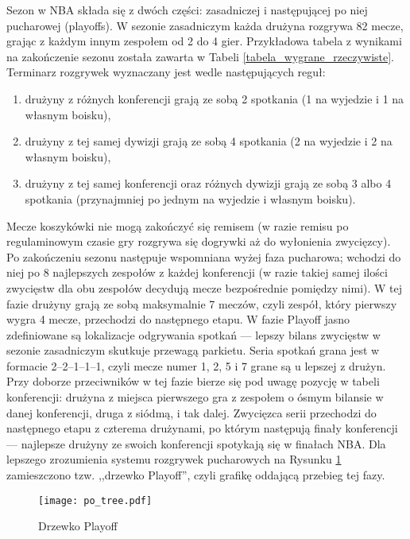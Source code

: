 \documentclass[inzynierska]{pwr_wmat_praca_dyplomowa}
\theoremstyle{plain}
\numberwithin{theorem}{chapter}
\theoremstyle{definition}
\numberwithin{theorem}{chapter}
\begin{document}
Sezon w NBA składa się z dwóch części: zasadniczej i następującej po niej pucharowej (playoffs). W sezonie zasadniczym każda drużyna rozgrywa 82 mecze, grając z każdym innym zespołem od 2 do 4 gier. Przykładowa tabela z wynikami na zakończenie sezonu została zawarta w Tabeli \ref{tabela_wygrane_rzeczywiste}. Terminarz rozgrywek wyznaczany jest wedle następujących reguł:
\begin{enumerate}
	\item drużyny z różnych konferencji grają ze sobą 2 spotkania (1 na wyjedzie i 1 na własnym boisku),
	\item drużyny z tej samej dywizji grają ze sobą 4 spotkania (2 na wyjedzie i 2 na własnym boisku),
	\item drużyny z tej samej konferencji oraz różnych dywizji grają ze sobą 3 albo 4 spotkania (przynajmniej po jednym na wyjedzie i własnym boisku).
\end{enumerate}
Mecze koszykówki nie mogą zakończyć się remisem (w razie remisu po regulaminowym czasie gry rozgrywa się dogrywki aż do wyłonienia zwycięzcy).
Po zakończeniu sezonu następuje wspomniana wyżej faza pucharowa; wchodzi do niej po 8 najlepszych zespołów z każdej konferencji (w razie takiej samej ilości zwycięstw dla obu zespołów decydują mecze bezpośrednie pomiędzy nimi). W tej fazie drużyny grają ze sobą maksymalnie 7 meczów, czyli zespół, który pierwszy wygra 4 mecze, przechodzi do następnego etapu. W fazie Playoff jasno zdefiniowane są lokalizacje odgrywania spotkań --- lepszy bilans zwycięstw w sezonie zasadniczym skutkuje przewagą parkietu. Seria spotkań grana jest w formacie 2–2–1–1–1, czyli mecze numer 1, 2, 5 i 7 grane są u lepszej z drużyn. Przy doborze przeciwników w tej fazie bierze się pod uwagę pozycję w tabeli konferencji: drużyna z miejsca pierwszego gra z zespołem o ósmym bilansie w danej konferencji, druga z siódmą, i tak dalej. Zwycięzca serii przechodzi do następnego etapu z czterema drużynami, po którym następują finały konferencji --- najlepsze drużyny ze swoich konferencji spotykają się w finałach NBA. Dla lepszego zrozumienia systemu rozgrywek pucharowych na Rysunku \ref{po_tree} zamieszczono tzw. ,,drzewko Playoff''\cite{playoffs}, czyli grafikę oddającą przebieg tej fazy.
\begin{figure}[t]
	\texttt{[image: po\_tree.pdf]}
	\caption{Drzewko Playoff}\label{po_tree}
	\centering
\end{figure}
\end{document}
